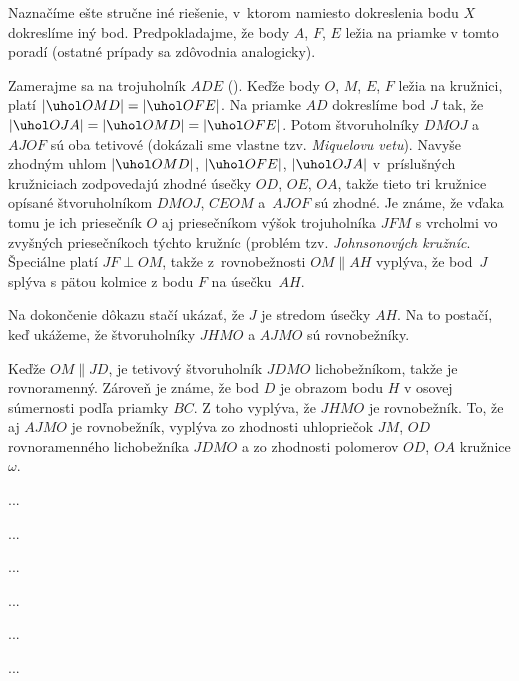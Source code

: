 {\ineriesenie
Naznačíme ešte stručne iné riešenie, v~ktorom namiesto dokreslenia bodu $X$ dokreslíme iný bod. Predpokladajme, že body $A$, $F$, $E$ ležia na priamke v tomto poradí (ostatné prípady sa zdôvodnia analogicky).

Zamerajme sa na trojuholník $ADE$ (\obr). Keďže body $O$, $M$, $E$, $F$ ležia na kružnici, platí $|\uhol OMD|=|\uhol OFE|$. Na priamke $AD$ dokreslíme bod $J$ tak, že $|\uhol OJA|=|\uhol OMD|=|\uhol OFE|$. Potom štvoruholníky $DMOJ$ a $AJOF$ sú oba tetivové (dokázali sme vlastne tzv. {\it Miquelovu vetu}). Navyše zhodným uhlom $|\uhol OMD|$, $|\uhol OFE|$, $|\uhol OJA|$ v~príslušných kružniciach zodpovedajú zhodné úsečky $OD$, $OE$, $OA$, takže tieto tri kružnice opísané štvoruholníkom $DMOJ$, $CEOM$ a~$AJOF$ sú zhodné. Je známe, že vďaka tomu je ich priesečník $O$ aj priesečníkom výšok trojuholníka $JFM$ s vrcholmi vo zvyšných priesečníkoch týchto kružníc (problém tzv. {\it Johnsonových kružníc}.
 Špeciálne platí $JF\perp OM$, takže z~rovnobežnosti $OM\parallel AH$ vyplýva, že bod~$J$ splýva s pätou kolmice z bodu $F$ na úsečku~$AH$.
%

Na dokončenie dôkazu stačí ukázať, že $J$ je stredom úsečky $AH$. Na to postačí, keď ukážeme, že štvoruholníky $JHMO$ a $AJMO$ sú rovnobežníky.

Keďže $OM\parallel JD$, je tetivový štvoruholník $JDMO$ lichobežníkom, takže je rovnoramenný. Zároveň je známe, že bod $D$ je obrazom bodu $H$ v osovej súmernosti podľa priamky $BC$. Z toho vyplýva, že $JHMO$ je rovnobežník.
To, že aj $AJMO$ je rovnobežník, vyplýva zo zhodnosti uhlopriečok $JM$, $OD$ rovnoramenného lichobežníka $JDMO$ a zo zhodnosti polomerov $OD$, $OA$ kružnice $\omega$.
}

{%
...}

{%
...}

{%
...}

{%
...}

{%
...}

{%
...}

